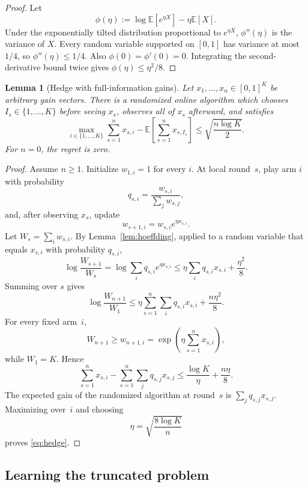 \documentclass[11pt]{article}
\newtheorem{lemma}[theorem]{Lemma}
\theoremstyle{remark}
\newcommand{\E}{\mathbb{E}}
\begin{document}
\begin{proof}
Let
\[
    \phi(\eta)
    :=
    \log\E[e^{\eta X}]-\eta\E[X].
\]
Under the exponentially tilted distribution proportional to $e^{\eta X}$,
$\phi''(\eta)$ is the variance of $X$.  Every random variable supported on
$[0,1]$ has variance at most $1/4$, so $\phi''(\eta)\le1/4$.  Also
$\phi(0)=\phi'(0)=0$.  Integrating the second-derivative bound twice gives
$\phi(\eta)\le\eta^2/8$.
\end{proof}

\begin{lemma}[Hedge with full-information gains]\label{lem:hedge}
Let $x_1,\ldots,x_n\in[0,1]^K$ be arbitrary gain vectors.  There is a
randomized online algorithm which chooses $I_s\in\{1,\ldots,K\}$ before seeing
$x_s$, observes all of $x_s$ afterward, and satisfies
\begin{equation}\label{eq:hedge}
    \max_{i\in\{1,\ldots,K\}}\sum_{s=1}^n x_{s,i}
    -
    \E\!\left[\sum_{s=1}^n x_{s,I_s}\right]
    \le
    \sqrt{\frac{n\log K}{2}}.
\end{equation}
For $n=0$, the regret is zero.
\end{lemma}

\begin{proof}
Assume $n\ge1$.  Initialize $w_{1,i}=1$ for every $i$.  At local round~$s$,
play arm $i$ with probability
\[
    q_{s,i}=\frac{w_{s,i}}{\sum_jw_{s,j}},
\]
and, after observing $x_s$, update
\[
    w_{s+1,i}=w_{s,i}e^{\eta x_{s,i}}.
\]
Let $W_s=\sum_iw_{s,i}$.  By Lemma~\ref{lem:hoeffding}, applied to a random
variable that equals $x_{s,i}$ with probability $q_{s,i}$,
\[
    \log\frac{W_{s+1}}{W_s}
    =
    \log\sum_iq_{s,i}e^{\eta x_{s,i}}
    \le
    \eta\sum_iq_{s,i}x_{s,i}+\frac{\eta^2}{8}.
\]
Summing over $s$ gives
\[
    \log\frac{W_{n+1}}{W_1}
    \le
    \eta\sum_{s=1}^n\sum_iq_{s,i}x_{s,i}
    +\frac{n\eta^2}{8}.
\]
For every fixed arm~$i$,
\[
    W_{n+1}
    \ge
    w_{n+1,i}
    =
    \exp\!\left(\eta\sum_{s=1}^n x_{s,i}\right),
\]
while $W_1=K$.  Hence
\[
    \sum_{s=1}^n x_{s,i}
    -
    \sum_{s=1}^n\sum_jq_{s,j}x_{s,j}
    \le
    \frac{\log K}{\eta}+\frac{n\eta}{8}.
\]
The expected gain of the randomized algorithm at round~$s$ is
$\sum_jq_{s,j}x_{s,j}$.  Maximizing over~$i$ and choosing
\[
    \eta=\sqrt{\frac{8\log K}{n}}
\]
proves \eqref{eq:hedge}.
\end{proof}

\subsection{Learning the truncated problem}
\end{document}
